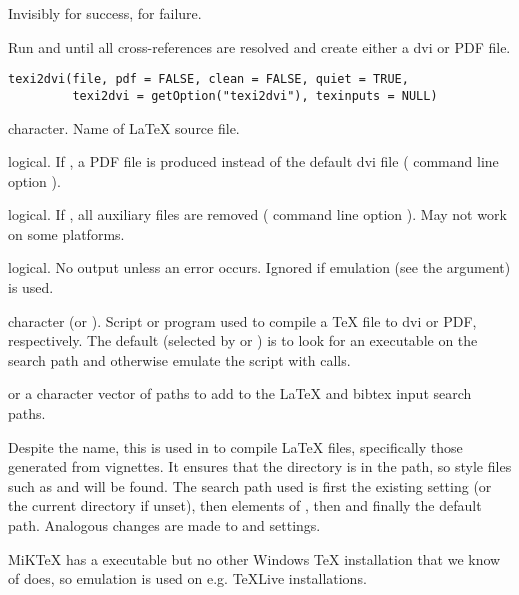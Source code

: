 %
\begin{Value}
Invisibly  for success,  for failure.
\end{Value}
%
\begin{Description}\relax
Run  and  until all cross-references are
resolved and create either a dvi or PDF file.
\end{Description}
%
\begin{Usage}
\begin{verbatim}
texi2dvi(file, pdf = FALSE, clean = FALSE, quiet = TRUE,
         texi2dvi = getOption("texi2dvi"), texinputs = NULL)
\end{verbatim}
\end{Usage}
%
\begin{Arguments}
\begin{ldescription}
\item[\code{file}] character.  Name of LaTeX source file.
\item[\code{pdf}] logical.  If , a PDF file is produced instead of
the default dvi file ( command line option ).
\item[\code{clean}] logical.  If , all auxiliary files are removed
( command line option ).  May not work on
some platforms.
\item[\code{quiet}] logical.  No output unless an error occurs.  Ignored if
emulation (see the  argument) is used.
\item[\code{texi2dvi}] character (or ).  Script or program used to
compile a TeX file to dvi or PDF, respectively.
The default (selected by  or ) is to look for an
executable on the search path and otherwise emulate the script with
 calls.
\item[\code{texinputs}]  or a character vector of paths to add to
the LaTeX and bibtex input search paths.
\end{ldescription}
\end{Arguments}
%
\begin{Details}\relax
Despite the name, this is used in \R{} to compile LaTeX files,
specifically those generated from vignettes.  It
ensures that the  directory is
in the  path, so \R{} style files such as 
and  will be found.  The search path used is first the
existing  setting (or the current directory if unset),
then elements of , then
 and finally the default
path. Analogous changes are made to  and
 settings.

MiKTeX has a  executable but no other Windows TeX
installation that we know of does, so emulation is used on e.g. TeXLive
installations.
\end{Details}
